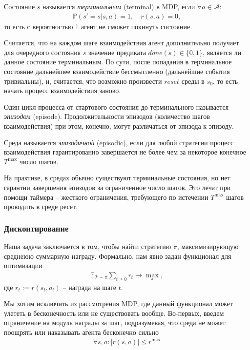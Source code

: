 \documentclass[%
	11pt,
	a4paper,
	utf8,
		]{article}
\begin{document}
Состояние $ s $ называется \emph{терминальным} (terminal) в MDP, если $ \forall a \in \mathcal{A} $:
\begin{align*}
	\mathbb{P}(s' = s | s, a) = 1, \quad r(s, a) = 0,
\end{align*}
то есть с вероятностью 1 \underline{агент не сможет покинуть состояние}.

Считается, что на каждом шаге взаимодействия агент дополнительно получает для очередного состояния $ s $ значение предиката $ done(s) \in \{0, 1\} $, является ли данное состояние терминальным. По сути, после попадания в терминальное состояние дальнейшее взаимодействие бессмысленно (дальнейшие события тривиальны), и, считается, что возможно произвести $ reset $ среды в $ s_0 $, то есть начать процесс взаимодействия заново.

Один цикл процесса от стартового состояния до терминального называется \emph{эпизодом} (episode). Продолжительности эпизодов (количество шагов взаимодействия) при этом, конечно, могут различаться от эпизода к эпизоду.

Среда называется \emph{эпизодичной} (episodic), если для любой стратегии процесс взаимодействия гарантированно завершается не более чем за некоторое конечное $ T^{\max} $ число шагов.


На практике, в средах обычно существуют терминальные состояния, но нет гарантии завершения эпизодов за ограниченное число шагов. Это лечат при помощи таймера -- жесткого ограничения, требующего по истечении $ T^{\max} $ шагов проводить в среде ресет.

\subsubsection{Дисконтирование}

Наша задача заключается в том, чтобы найти стратегию $ \pi $, максимизирующую среднеюю суммарную награду. Формально, нам явно задан функционал для оптимизации
\begin{align*}
	\mathbb{E}_{\mathcal{T} \sim \pi} \sum_{t \geqslant 0} r_t \rightarrow \underset{\pi}{\max},
\end{align*}
где $ r_t := r(s_t, a_t) $ -- награда на шаге $ t $.

Мы хотим исключить из рассмотрения MDP, где данный функционал может улететь в бесконечность или не существовать вообще. Во-первых, введем ограничение на модуль награды за шаг, подразумевая, что среда не может поощрять или наказывать агента бесконечно сильно
\begin{align}\label{eq:rl-discont}
	\forall s, a: | r(s, a) | \leqslant r^{\max}
\end{align}
\end{document}
